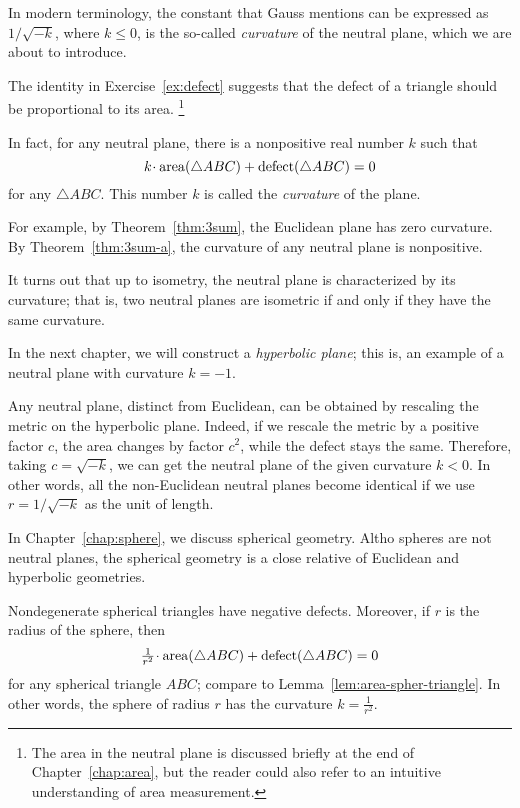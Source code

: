 In modern terminology, the constant that Gauss mentions 
can be expressed as $1/\sqrt{-k}$, 
where $k\le 0$, is the so-called \emph{curvature} of the neutral plane, which we are about to introduce.

The identity in Exercise~\ref{ex:defect} suggests that the defect of a triangle should be proportional to its area.%
\footnote{The area in the neutral plane is discussed briefly at the end of Chapter~\ref{chap:area},
but the reader could also refer to an intuitive understanding of area measurement.}

In fact, for any neutral plane, there is a nonpositive real number $k$
such that 
$$k\cdot\area(\triangle ABC)+\defect(\triangle ABC)=0$$
for any $\triangle ABC$.
This number $k$ is called the \emph{curvature} of the plane.

For example, by Theorem~\ref{thm:3sum}, the Euclidean plane has zero curvature.
By Theorem~\ref{thm:3sum-a}, the curvature of any neutral plane is nonpositive.

It turns out that up to isometry, the neutral plane is characterized by its curvature;
that is, two neutral planes are isometric if and only if they have the same curvature. 

In the next chapter, we will construct a {}\emph{hyperbolic plane};
this is, an example of a neutral plane with curvature $k=-1$.

Any neutral plane, distinct from Euclidean,
can be obtained by rescaling the metric on the hyperbolic plane.
Indeed,
if we rescale the metric by a positive factor $c$,
the area changes by factor $c^2$, while the defect stays the same.
Therefore, taking $c=\sqrt{-k}$,
we can get the neutral plane of the given curvature $k<0$.
In other words, all the non-Euclidean neutral planes become identical
if we use $r=1/\sqrt{-k}$ as the unit of length.

\medskip

In Chapter~\ref{chap:sphere}, we discuss spherical geometry.
Altho spheres are not neutral planes,
the spherical geometry is a close relative of Euclidean and hyperbolic geometries.

Nondegenerate spherical triangles have negative defects.
Moreover, 
if $r$ is the radius of the sphere, then
$$\tfrac1{r^2}\cdot\area(\triangle ABC)+\defect(\triangle ABC)=0$$
for any spherical triangle $ABC$; compare to Lemma~\ref{lem:area-spher-triangle}.
In other words, 
the sphere of radius $r$ has the curvature $k=\tfrac1{r^2}$.
